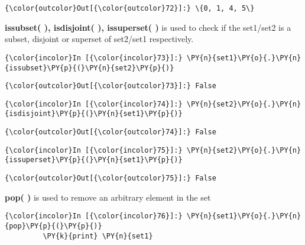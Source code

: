             \begin{Verbatim}[commandchars=\\\{\}]
{\color{outcolor}Out[{\color{outcolor}72}]:} \{0, 1, 4, 5\}
\end{Verbatim}
        
    \textbf{issubset( ), isdisjoint( ), issuperset( )} is used to check if
the set1/set2 is a subset, disjoint or superset of set2/set1
respectively.

    \begin{Verbatim}[commandchars=\\\{\}]
{\color{incolor}In [{\color{incolor}73}]:} \PY{n}{set1}\PY{o}{.}\PY{n}{issubset}\PY{p}{(}\PY{n}{set2}\PY{p}{)}
\end{Verbatim}

            \begin{Verbatim}[commandchars=\\\{\}]
{\color{outcolor}Out[{\color{outcolor}73}]:} False
\end{Verbatim}
        
    \begin{Verbatim}[commandchars=\\\{\}]
{\color{incolor}In [{\color{incolor}74}]:} \PY{n}{set2}\PY{o}{.}\PY{n}{isdisjoint}\PY{p}{(}\PY{n}{set1}\PY{p}{)}
\end{Verbatim}

            \begin{Verbatim}[commandchars=\\\{\}]
{\color{outcolor}Out[{\color{outcolor}74}]:} False
\end{Verbatim}
        
    \begin{Verbatim}[commandchars=\\\{\}]
{\color{incolor}In [{\color{incolor}75}]:} \PY{n}{set2}\PY{o}{.}\PY{n}{issuperset}\PY{p}{(}\PY{n}{set1}\PY{p}{)}
\end{Verbatim}

            \begin{Verbatim}[commandchars=\\\{\}]
{\color{outcolor}Out[{\color{outcolor}75}]:} False
\end{Verbatim}
        
    \textbf{pop( )} is used to remove an arbitrary element in the set

    \begin{Verbatim}[commandchars=\\\{\}]
{\color{incolor}In [{\color{incolor}76}]:} \PY{n}{set1}\PY{o}{.}\PY{n}{pop}\PY{p}{(}\PY{p}{)}
         \PY{k}{print} \PY{n}{set1}
\end{Verbatim}

